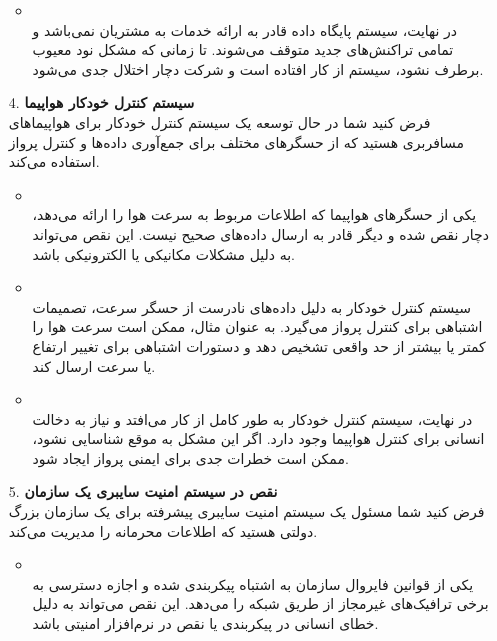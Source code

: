 \begin{qsolve}
	\begin{enumerate}
		\item [ ]
		\begin{itemize}
			\item {}\\
			در نهایت، سیستم پایگاه داده قادر به ارائه خدمات به مشتریان نمی‌باشد و تمامی تراکنش‌های جدید متوقف می‌شوند. تا زمانی که مشکل نود معیوب برطرف نشود، سیستم از کار افتاده است و شرکت دچار اختلال جدی می‌شود.
			
		\end{itemize}
		
		
		\item [4.]
		\textbf{سیستم کنترل خودکار هواپیما}\\
		فرض کنید شما در حال توسعه یک سیستم کنترل خودکار برای هواپیماهای مسافربری هستید که از حسگرهای مختلف برای جمع‌آوری داده‌ها و کنترل پرواز استفاده می‌کند.
		
		\begin{itemize}
			\item {}\\
			یکی از حسگرهای هواپیما که اطلاعات مربوط به سرعت هوا را ارائه می‌دهد، دچار نقص شده و دیگر قادر به ارسال داده‌های صحیح نیست. این نقص می‌تواند به دلیل مشکلات مکانیکی یا الکترونیکی باشد.
			
			\item {}\\
			سیستم کنترل خودکار به دلیل داده‌های نادرست از حسگر سرعت، تصمیمات اشتباهی برای کنترل پرواز می‌گیرد. به عنوان مثال، ممکن است سرعت هوا را کمتر یا بیشتر از حد واقعی تشخیص دهد و دستورات اشتباهی برای تغییر ارتفاع یا سرعت ارسال کند.
			
			\item {}\\
			در نهایت، سیستم کنترل خودکار به طور کامل از کار می‌افتد و نیاز به دخالت انسانی برای کنترل هواپیما وجود دارد. اگر این مشکل به موقع شناسایی نشود، ممکن است خطرات جدی برای ایمنی پرواز ایجاد شود.
		\end{itemize}
		
		
		
		\item [5.]
		\textbf{نقص در سیستم امنیت سایبری یک سازمان}\\
		فرض کنید شما مسئول یک سیستم امنیت سایبری پیشرفته برای یک سازمان بزرگ دولتی هستید که اطلاعات محرمانه را مدیریت می‌کند.
		
		\begin{itemize}
			\item {}\\
			یکی از قوانین فایروال سازمان به اشتباه پیکربندی شده و اجازه دسترسی به برخی ترافیک‌های غیرمجاز از طریق شبکه را می‌دهد. این نقص می‌تواند به دلیل خطای انسانی در پیکربندی یا نقص در نرم‌افزار امنیتی باشد.
			

\end{itemize}
\end{enumerate}
\end{qsolve}
